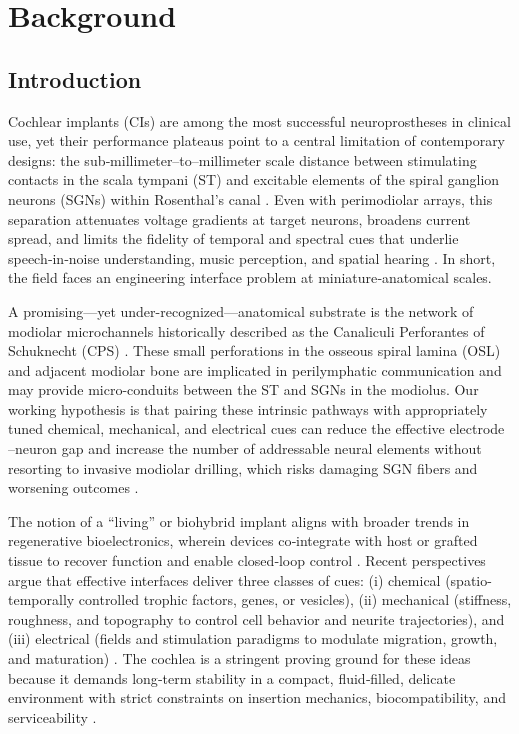 \documentclass[referee,pdflatex, sn-vancouver-num]{sn-jnl}%
\theoremstyle{thmstyleone}%
\theoremstyle{thmstyletwo}%
\theoremstyle{thmstylethree}%
\DeclareRobustCommand{\textendash}{\ifmmode\text{-}\else\leavevmode\hbox{--}\fi}
\begin{document}
\section{Background}\label{sec1}
\subsection{Introduction}
\noindent
Cochlear implants (CIs) are among the most successful neuroprostheses in clinical use, yet their performance plateaus point to a central limitation of contemporary designs: the sub‑millimeter–to–millimeter scale distance between stimulating contacts in the scala tympani (ST) and excitable elements of the spiral ganglion neurons (SGNs) within Rosenthal's canal \cite{Vecchi2024}. Even with perimodiolar arrays, this separation attenuates voltage gradients at target neurons, broadens current spread, and limits the fidelity of temporal and spectral cues that underlie speech‑in‑noise understanding, music perception, and spatial hearing \cite{wilson2008,wilson2014}. In short, the field faces an engineering interface problem at miniature‑anatomical scales.

A promising—yet under-recognized—anatomical substrate is the network of modiolar microchannels historically described as the Canaliculi Perforantes of Schuknecht (CPS) \cite{Schuknecht1959}. These small perforations in the osseous spiral lamina (OSL) and adjacent modiolar bone are implicated in perilymphatic communication and may provide micro-conduits between the ST and SGNs in the modiolus. Our working hypothesis is that pairing these intrinsic pathways with appropriately tuned chemical, mechanical, and electrical cues can reduce the effective electrode \textendash neuron gap and increase the number of addressable neural elements without resorting to invasive modiolar drilling, which risks damaging SGN fibers and worsening outcomes \cite{Vecchi2024}.

The notion of a “living” or biohybrid implant aligns with broader trends in regenerative bioelectronics, wherein devices co‑integrate with host or grafted tissue to recover function and enable closed‑loop control \cite{Roemer2016}. Recent perspectives argue that effective interfaces deliver three classes of cues: (i) chemical (spatio-temporally controlled trophic factors, genes, or vesicles), (ii) mechanical (stiffness, roughness, and topography to control cell behavior and neurite trajectories), and (iii) electrical (fields and stimulation paradigms to modulate migration, growth, and maturation) \cite{CarnicerLombarte2024AdvMat}. The cochlea is a stringent proving ground for these ideas because it demands long‑term stability in a compact, fluid‑filled, delicate environment with strict constraints on insertion mechanics, biocompatibility, and serviceability \cite{Vecchi2024}.
\end{document}
